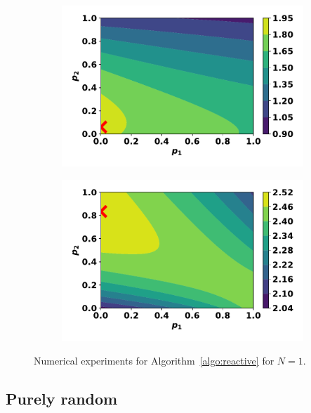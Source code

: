 \documentclass[10pt]{article}
\begin{document}
\begin{figure}
    \centering
    \begin{subfigure}{0.45\textwidth}
        \centering
        \includegraphics[width=.95\textwidth]{img/reactive_pairwise_one.pdf}
    \end{subfigure}
    \begin{subfigure}{0.45\textwidth}
        \centering
        \includegraphics[width=.95\textwidth]{img/reactive_pairwise_two.pdf}
    \end{subfigure}
    \caption{Numerical experiments for Algorithm~\ref{algo:reactive} for \(N=1\).}
    \label{fig:reactive_pairwise_results}
\end{figure}

\subsection{Purely random}\label{section:purely_analytical}
\end{document}
